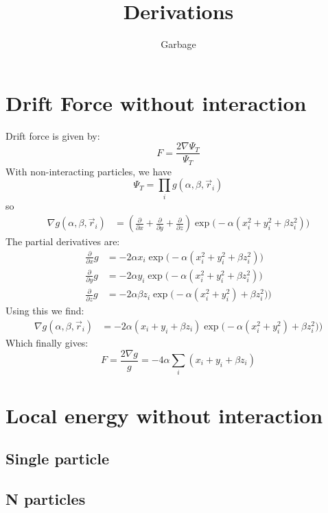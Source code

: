 \documentclass[12pt]{article}
\newcommand{\f}[2]{\frac{#1}{#2}}
\newcommand{\beq}{\begin{equation*}}
\newcommand{\eeq}{\end{equation*}}
\newcommand{\pp}[1]{\frac{\partial}{\partial #1}}
\begin{document}
\title{Derivations}
\author{Garbage}
\maketitle

\section*{Drift Force without interaction}

Drift force is given by:
\beq
F = \f{2\nabla\Psi_T}{\Psi_T}
\eeq
With non-interacting particles, we have
\beq
\Psi_T = \prod_{i} g(\alpha, \beta, \vec{r}_i)
\eeq
so
\begin{align*}
	\nabla g(\alpha, \beta, \vec{r}_i) &= 
	\left( \pp{x}+\pp{y}+\pp{z}\right)
	\exp\big(-\alpha(x^{2}_i + y^{2}_i + \beta z^{2}_i)\big)
\end{align*}
The partial derivatives are:
\begin{align*}
	\pp{x}g &= -2\alpha x_i \exp\big(-\alpha(x^{2}_i + y^{2}_i + \beta z^{2}_i)\big) \\
	\pp{y}g &= -2\alpha y_i \exp\big(-\alpha(x^{2}_i + y^{2}_i + \beta z^{2}_i)\big) \\
	\pp{z}g &= -2\alpha\beta z_i \exp\big(-\alpha(x^{2}_i + y^{2}_i) + \beta z^{2}_i)\big)
\end{align*}
Using this we find:
\begin{align*}
	\nabla g(\alpha, \beta, \vec{r}_i) &= 
	-2\alpha(x_i + y_i + \beta z_i)\exp\big(-\alpha(x^{2}_i + y^{2}_i) + \beta z^{2}_i)\big)
\end{align*}
Which finally gives:
\beq
	F = \f{2\nabla g}{g} = -4\alpha \sum_{i}(x_i + y_i + \beta z_i)
\eeq

\section{Local energy without interaction}
\subsection{Single particle}
\subsection{N particles}
\end{document}
